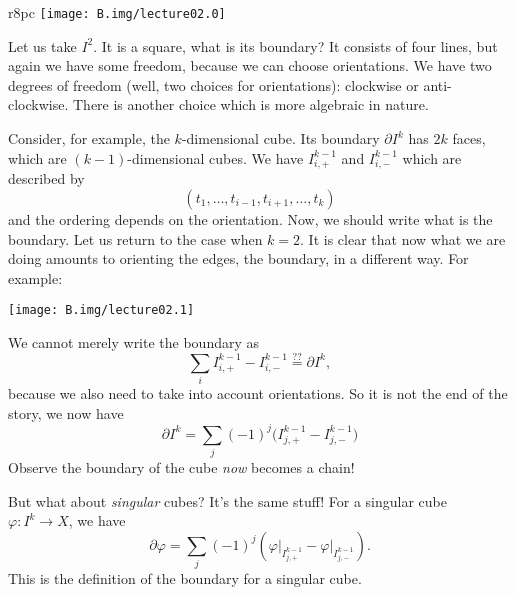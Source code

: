\begin{wrapfigure}{r}{8pc}
  \vspace{-12pt}
  \centering
  \texttt{[image: B.img/lecture02.0]}
  \vspace{-12pt}
\end{wrapfigure}
\noindent\ignorespaces %
Let us take $I^2$. It is a square, what is its boundary? It
consists of four lines, but again we have some freedom, because
we can choose orientations. We have two degrees of freedom (well,
two choices for orientations): clockwise or anti-clockwise. There
is another choice which is more algebraic in nature. 

Consider, for example, the $k$-dimensional cube. Its boundary
$\partial I^k$ has $2k$ faces, which are $(k-1)$-dimensional
cubes. We have $I^{k-1}_{i,+}$ and $I^{k-1}_{i,-}$ which are
described by
\begin{equation*}
(t_1,\dots,t_{i-1},t_{i+1},\dots,t_{k})
\end{equation*}
and the ordering depends on the orientation. Now, we should write
what is the boundary. Let us return to the case when $k=2$. It is
clear that now what we are doing amounts to orienting the edges,
the boundary, in a different way. For example:
\begin{center}
  \texttt{[image: B.img/lecture02.1]}
\end{center}
We cannot merely write the boundary as
\begin{equation}
\sum_{i}I^{k-1}_{i,+}-I^{k-1}_{i,-}\stackrel{??}{=}\partial I^{k},
\end{equation}
because we also need to take into account orientations. So it is
not the end of the story, we now have
\begin{equation}
\partial I^{k} =
\sum_{j}(-1)^{j}\bigl(I^{k-1}_{j,+}-I^{k-1}_{j,-}\bigr)
\end{equation}
Observe the boundary of the cube \emph{now} becomes a chain! 

But what about \emph{singular} cubes? It's the same stuff! For a
singular cube $\varphi\colon I^k\to X$, we have
\begin{equation}
\partial\varphi =
\sum_{j}(-1)^{j}\left(\left.\varphi\right|_{I^{k-1}_{j,+}}-\left.\varphi\right|_{I^{k-1}_{j,-}}\right).
\end{equation}
This is the definition of the boundary for a singular cube.

